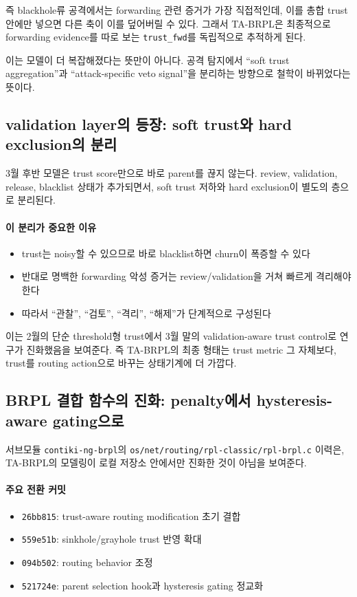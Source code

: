 \documentclass[12pt,a4paper]{article}
\begin{document}
즉 blackhole류 공격에서는 forwarding 관련 증거가 가장 직접적인데,
이를 총합 trust 안에만 넣으면 다른 축이 이를 덮어버릴 수 있다.
그래서 TA-BRPL은 최종적으로 forwarding evidence를 따로 보는
\texttt{trust\_fwd}를 독립적으로 추적하게 된다.

이는 모델이 더 복잡해졌다는 뜻만이 아니다. 공격 탐지에서
``soft trust aggregation''과 ``attack-specific veto signal''을 분리하는 방향으로
철학이 바뀌었다는 뜻이다.

\subsection{validation layer의 등장: soft trust와 hard exclusion의 분리}

3월 후반 모델은 trust score만으로 바로 parent를 끊지 않는다.
review, validation, release, blacklist 상태가 추가되면서,
soft trust 저하와 hard exclusion이 별도의 층으로 분리된다.

\paragraph{이 분리가 중요한 이유}
\begin{itemize}[leftmargin=1.5em]
\item trust는 noisy할 수 있으므로 바로 blacklist하면 churn이 폭증할 수 있다
\item 반대로 명백한 forwarding 악성 증거는 review/validation을 거쳐
빠르게 격리해야 한다
\item 따라서 ``관찰'', ``검토'', ``격리'', ``해제''가 단계적으로 구성된다
\end{itemize}

이는 2월의 단순 threshold형 trust에서 3월 말의 validation-aware trust control로
연구가 진화했음을 보여준다. 즉 TA-BRPL의 최종 형태는 trust metric 그 자체보다,
trust를 routing action으로 바꾸는 상태기계에 더 가깝다.

\subsection{BRPL 결합 함수의 진화: penalty에서 hysteresis-aware gating으로}

서브모듈 \texttt{contiki-ng-brpl}의
\texttt{os/net/routing/rpl-classic/rpl-brpl.c} 이력은,
TA-BRPL의 모델링이 로컬 저장소 안에서만 진화한 것이 아님을 보여준다.

\paragraph{주요 전환 커밋}
\begin{itemize}[leftmargin=1.5em]
\item \texttt{26bb815}: trust-aware routing modification 초기 결합
\item \texttt{559e51b}: sinkhole/grayhole trust 반영 확대
\item \texttt{094b502}: routing behavior 조정
\item \texttt{521724e}: parent selection hook과 hysteresis gating 정교화
\end{itemize}
\end{document}
